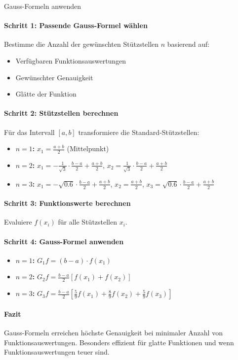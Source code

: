 \begin{KR}{Gauss-Formeln anwenden}
\paragraph{Schritt 1: Passende Gauss-Formel wählen}
Bestimme die Anzahl der gewünschten Stützstellen $n$ basierend auf:
\begin{itemize}
    \item Verfügbaren Funktionsauswertungen
    \item Gewünschter Genauigkeit
    \item Glätte der Funktion
\end{itemize}

\paragraph{Schritt 2: Stützstellen berechnen}
Für das Intervall $[a,b]$ transformiere die Standard-Stützstellen:
\begin{itemize}
    \item \textbf{$n=1$:} $x_1 = \frac{a+b}{2}$ (Mittelpunkt)
    \item \textbf{$n=2$:} $x_1 = -\frac{1}{\sqrt{3}} \cdot \frac{b-a}{2} + \frac{a+b}{2}$, $x_2 = \frac{1}{\sqrt{3}} \cdot \frac{b-a}{2} + \frac{a+b}{2}$
    \item \textbf{$n=3$:} $x_1 = -\sqrt{0.6} \cdot \frac{b-a}{2} + \frac{a+b}{2}$, $x_2 = \frac{a+b}{2}$, $x_3 = \sqrt{0.6} \cdot \frac{b-a}{2} + \frac{a+b}{2}$
\end{itemize}

\paragraph{Schritt 3: Funktionswerte berechnen}
Evaluiere $f(x_i)$ für alle Stützstellen $x_i$.

\paragraph{Schritt 4: Gauss-Formel anwenden}
\begin{itemize}
    \item \textbf{$n=1$:} $G_1f = (b-a) \cdot f(x_1)$
    \item \textbf{$n=2$:} $G_2f = \frac{b-a}{2}[f(x_1) + f(x_2)]$
    \item \textbf{$n=3$:} $G_3f = \frac{b-a}{2}[\frac{5}{9}f(x_1) + \frac{8}{9}f(x_2) + \frac{5}{9}f(x_3)]$
\end{itemize}

\paragraph{Fazit}
Gauss-Formeln erreichen höchste Genauigkeit bei minimaler Anzahl von Funktionsauswertungen. Besonders effizient für glatte Funktionen und wenn Funktionsauswertungen teuer sind.
\end{KR}

